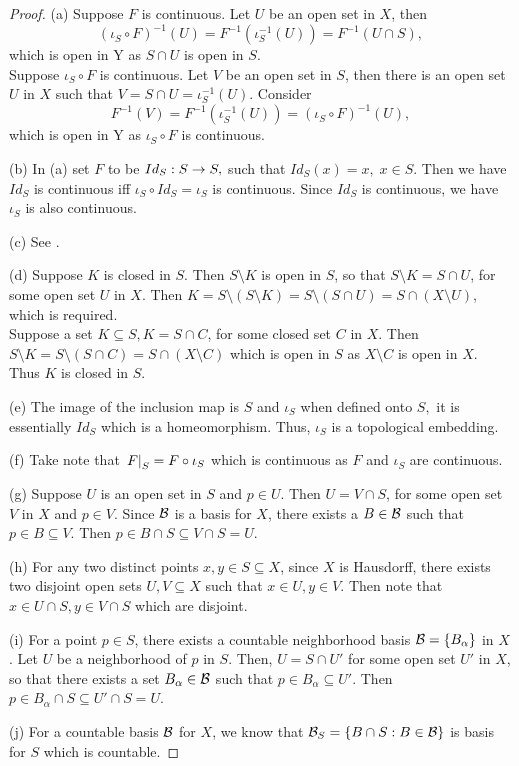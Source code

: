 \documentclass[11pt,a4paper]{article}
\begin{document}
\begin{proof}
(a) \forward Suppose $F$ is continuous. Let $U$ be an open set in $X$, then 
\begin{equation*}
(\iota_S\circ F)^{-1}(U) = F^{-1}(\iota_S^{-1}(U)) = F^{-1}(U\cap S),
\end{equation*}
which is open in Y as $S\cap U$ is open in $S$.\\
\converse Suppose $\iota_S\circ F$ is continuous. Let $V$ be an open set in $S$, then there is an open set $U$ in $X$ such that $V = S\cap U = \iota_S^{-1}(U)$. Consider
\begin{equation*}
F^{-1}(V) = F^{-1}(\iota_S^{-1}(U)) = (\iota_S\circ F)^{-1}(U),
\end{equation*}
which is open in Y as $\iota_S\circ F$ is continuous.

(b) In (a) set $F$ to be $Id_S:S\rightarrow S,$ such that $Id_S(x) = x,\;x\in S$. Then we have $Id_S$ is continuous iff $\iota_S\circ Id_S = \iota_S$ is continuous. Since $Id_S$ is continuous, we have $\iota_S$ is also continuous.

(c) See \cite[Thm. 3.24]{JohnLee}.

(d) \forward Suppose $K$ is closed in $S$. Then $S\setminus K$ is open in $S$, so that $S\setminus K = S\cap U$, for some open set $U$ in $X$. Then 
$K = S\setminus (S\setminus K) = S \setminus (S\cap U) = S\cap (X\setminus U)$,
which is required.\\
\converse Suppose a set $K\subseteq S, K = S\cap C$, for some closed set $C$ in $X$. Then $S\setminus K = S\setminus (S\cap C) = S\cap(X\setminus C)$ which is open in $S$ as $X\setminus C$ is open in $X$. Thus $K$ is closed in $S$.

(e) The image of the inclusion map is $S$ and $\iota_S$ when defined onto $S,$ it is essentially $Id_S$ which is a homeomorphism. Thus, $\iota_S$ is a topological embedding.

(f) Take note that $\left.F\right|_{S} = F\circ\iota_S$ which is continuous as $F$ and $\iota_S$ are continuous.

(g) Suppose $U$ is an open set in $S$ and $p\in U$. Then $U = V\cap S$, for some open set $V$ in $X$ and $p\in V$. Since $\mathcal{B}$ is a basis for $X$, there exists a $B\in \mathcal{B}$ such that $p\in B\subseteq V$. Then $p\in B\cap S\subseteq V\cap S = U$.

(h) For any two distinct points $x,y\in S\subseteq X$, since $X$ is Hausdorff, there exists two disjoint open sets $U, V\subseteq X$ such that $x\in U, y\in V$. Then note that $x\in U\cap S, y\in V\cap S$ which are disjoint.

(i) For a point $p\in S$, there exists a countable neighborhood basis $\mathcal{B} = \{B_\alpha\}$ in $X$. Let $U$ be a neighborhood of $p$ in $S$. Then, $U = S\cap U'$ for some open set $U'$ in $X$, so that there exists a set $B_\alpha\in \mathcal{B}$ such that $p\in B_\alpha\subseteq U'$. Then $p\in B_\alpha\cap S \subseteq U'\cap S = U$.

(j) For a countable basis $\mathcal{B}$ for $X$, we know that $\mathcal{B}_S = \{B\cap S:B\in\mathcal{B}\}$ is basis for $S$ which is countable.
\end{proof}
\end{document}
